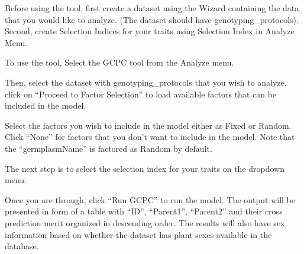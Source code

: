 \documentclass[
  12pt,
]{book}
\begin{document}
Before using the tool, first create a dataset using the Wizard containing the data that you would like to analyze. (The dataset should have genotyping\_protocols). Second, create Selection Indices for your traits using Selection Index in Analyze Menu.

To use the tool, Select the GCPC tool from the Analyze menu.

Then, select the dataset with genotyping\_protocols that you wish to analyze, click on ``Proceed to Factor Selection'' to load available factors that can be included in the model.

Select the factors you wish to include in the model either as Fixed or Random. Click ``None'' for factors that you don't want to include in the model. Note that the ``germplasmName'' is factored as Random by default.

The next step is to select the selection index for your traits on the dropdown menu.

Once you are through, click ``Run GCPC'' to run the model. The output will be presented in form of a table with ``ID'', ``Parent1'', ``Parent2'' and their cross prediction merit organized in descending order. The results will also have sex information based on whether the dataset has plant sexes available in the database.
\end{document}
